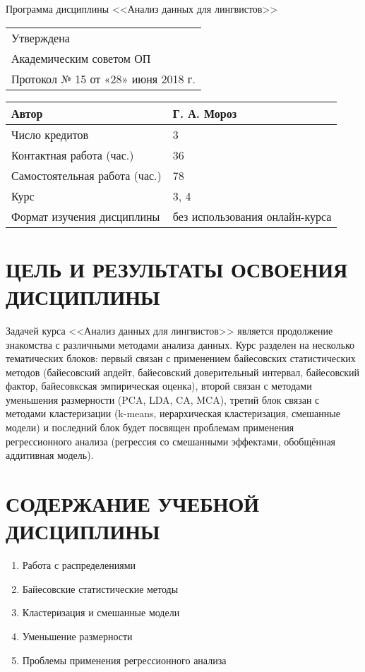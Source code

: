 \documentclass[a4paper]{article}
\begin{document}
\begin{center}
{\Large Программа дисциплины <<Анализ данных для лингвистов>>}
\end{center}
\begin{flushright}
\begin{tabular}{l}
Утверждена                          \\
Академическим советом ОП            \\
Протокол № 15 от  «28» июня 2018 г.
\end{tabular}
\end{flushright}
\begin{center}
\begin{tabular}{|l|l|}
\hline
Автор                         & Г. А. Мороз                    \\ \hline
Число кредитов                & 3                              \\ \hline
Контактная работа (час.)      & 36                             \\ \hline
Самостоятельная работа (час.) & 78                             \\ \hline
Курс                          & 3, 4                            \\ \hline
Формат изучения дисциплины    & без использования онлайн-курса \\ \hline
\end{tabular}
\end{center}
\section{ЦЕЛЬ И РЕЗУЛЬТАТЫ ОСВОЕНИЯ ДИСЦИПЛИНЫ}
Задачей курса <<Анализ данных для лингвистов>> является продолжение знакомства с различными методами анализа данных. Курс разделен на несколько тематических блоков: первый связан с применением байесовских статистических методов (байесовский апдейт, байесовский доверительный интервал, байесовский фактор, байесовкская эмпирическая оценка), второй связан с методами уменьшения размерности (PCA, LDA, CA, MCA), третий блок связан с методами кластеризации (k-means, иерархическая кластеризация, смешанные модели) и последний блок будет посвящен проблемам применения регрессионного анализа (регрессия со смешанными эффектами, обобщённая аддитивная модель).
\section{СОДЕРЖАНИЕ УЧЕБНОЙ ДИСЦИПЛИНЫ}
\begin{enumerate}
\item Работа с распределениями
\item Байесовские статистические методы
\item Кластеризация и смешанные модели
\item Уменьшение размерности
\item Проблемы применения регрессионного анализа
\end{enumerate}
\end{document}
